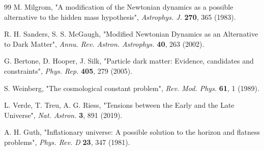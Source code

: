 \begin{thebibliography}{99}
M. Milgrom, "A modification of the Newtonian dynamics as a possible alternative to the hidden mass hypothesis", \emph{Astrophys. J.} \textbf{270}, 365 (1983).

R. H. Sanders, S. S. McGaugh, "Modified Newtonian Dynamics as an Alternative to Dark Matter", \emph{Annu. Rev. Astron. Astrophys.} \textbf{40}, 263 (2002).

G. Bertone, D. Hooper, J. Silk, "Particle dark matter: Evidence, candidates and constraints", \emph{Phys. Rep.} \textbf{405}, 279 (2005).

S. Weinberg, "The cosmological constant problem", \emph{Rev. Mod. Phys.} \textbf{61}, 1 (1989).

L. Verde, T. Treu, A. G. Riess, "Tensions between the Early and the Late Universe", \emph{Nat. Astron.} \textbf{3}, 891 (2019).

A. H. Guth, "Inflationary universe: A possible solution to the horizon and flatness problems", \emph{Phys. Rev. D} \textbf{23}, 347 (1981).

\end{thebibliography}


